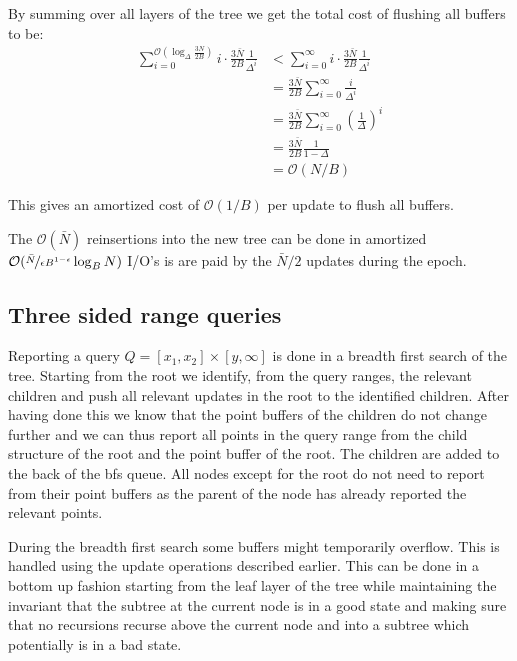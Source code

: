 \documentclass[twoside,11pt,openright]{report}
\begin{document}
By summing over all layers of the tree we get the total cost of flushing all buffers to be:
\begin{align*}
\sum\limits_{i=0}^{\mathcal{O}(\log_\Delta \frac{3N}{2B})} i \cdot \frac{3\bar{N}}{2B} \frac{1}{\Delta^i} &< 
\sum\limits_{i=0}^{\infty} i \cdot \frac{3\bar{N}}{2B} \frac{1}{\Delta^i} \\
&= \frac{3\bar{N}}{2B} \sum\limits_{i=0}^{\infty} \frac{i}{\Delta^i} \\
&= \frac{3\bar{N}}{2B} \sum\limits_{i=0}^{\infty} \left(\frac{1}{\Delta}\right)^i \\
&= \frac{3\bar{N}}{2B} \frac{1}{1-\Delta} \\
&= \mathcal{O}(N/B)
\end{align*}

This gives an amortized cost of $\mathcal{O}(1/B)$ per update to flush all buffers.

The $\mathcal{O}(\bar{N})$ reinsertions into the new tree can be done in amortized $\mathcal{O}(\nicefrac{\bar{N}}{\epsilon B^{1-\epsilon}} \log_B N)$ I/O's is are paid by the $\bar{N}/2$ updates during the epoch.


\subsection{Three sided range queries}
\label{subsec:brodal_3_sided}
Reporting a query $Q = \left[ x_1,x_2 \right] \times \left[y, \infty \right]$ is done in a breadth first search of the tree. Starting from the root we identify, from the query ranges, the relevant children and push all relevant updates in the root to the identified children. After having done this we know that the point buffers of the children do not change further and we can thus report all points in the query range from the child structure of the root and the point buffer of the root. The children are added to the back of the bfs queue. All nodes except for the root do not need to report from their point buffers as the parent of the node has already reported the relevant points.

During the breadth first search some buffers might temporarily overflow. This is handled using the update operations described earlier. This can be done in a bottom up fashion starting from the leaf layer of the tree while maintaining the invariant that the subtree at the current node is in a good state and making sure that no recursions recurse above the current node and into a subtree which potentially is in a bad state.
\end{document}
